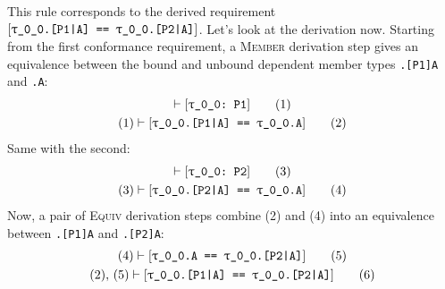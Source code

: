 \documentclass[../generics]{subfiles}
\begin{document}
\begin{example}
This rule corresponds to the derived requirement $[\texttt{\texttt{$\uptau$\_0\_0}.[\texttt{P1}|\texttt{A}] == \texttt{$\uptau$\_0\_0}.[\texttt{P2}|\texttt{A}]}]$. Let's look at the derivation now. Starting from the first conformance requirement, a \textsc{Member} derivation step gives an equivalence between the bound and unbound dependent member types \texttt{.[P1]A} and \texttt{.A}:
\begin{gather*}
\vdash[\texttt{\texttt{$\uptau$\_0\_0}:~P1}]\tag{1}\\
(1)\vdash[\texttt{\texttt{$\uptau$\_0\_0}.[\texttt{P1}|\texttt{A}] == \texttt{$\uptau$\_0\_0}.\texttt{A}}]\tag{2}
\end{gather*}
Same with the second:
\begin{gather*}
\vdash[\texttt{\texttt{$\uptau$\_0\_0}:~P2}]\tag{3}\\
(3)\vdash[\texttt{\texttt{$\uptau$\_0\_0}.[\texttt{P2}|\texttt{A}] == \texttt{$\uptau$\_0\_0}.\texttt{A}}]\tag{4}
\end{gather*}
Now, a pair of \textsc{Equiv} derivation steps combine (2) and (4) into an equivalence between \texttt{.[P1]A} and \texttt{.[P2]A}:
\begin{gather*}
(4)\vdash[\texttt{\texttt{$\uptau$\_0\_0}.\texttt{A} == \texttt{$\uptau$\_0\_0}.[\texttt{P2}|\texttt{A}]}]\tag{5}\\
(2),\,(5)\vdash[\texttt{\texttt{$\uptau$\_0\_0}.[\texttt{P1}|\texttt{A}] == \texttt{$\uptau$\_0\_0}.[\texttt{P2}|\texttt{A}]}]\tag{6}
\end{gather*}

\end{example}
\end{document}
